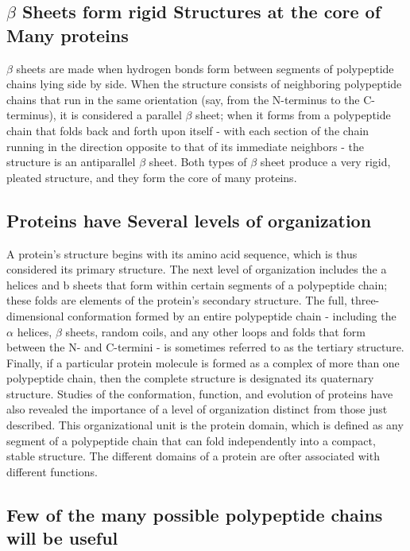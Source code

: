 \subsection{$\beta$ Sheets form rigid Structures at the core of Many proteins}

$\beta$ sheets are made when hydrogen bonds form between segments of polypeptide
chains lying side by side. When the structure consists of neighboring polypeptide chains that
run in the same orientation (say, from the N-terminus to the C-terminus),
it is considered a parallel $\beta$ sheet; when it forms from a polypeptide chain
that folds back and forth upon itself - with each section of the chain running
in the direction opposite to that of its immediate neighbors - the
structure is an antiparallel $\beta$ sheet. Both types of $\beta$ sheet
produce a very rigid, pleated structure, and they form the core of many
proteins.

\subsection{Proteins have Several levels of organization}

A protein’s structure begins with its
amino acid sequence, which is thus considered its primary structure. The
next level of organization includes the a helices and b sheets that form
within certain segments of a polypeptide chain; these folds are elements
of the protein’s secondary structure. The full, three-dimensional conformation
formed by an entire polypeptide chain - including the $\alpha$ helices,
$\beta$ sheets, random coils, and any other loops and folds that form between
the N- and C-termini - is sometimes referred to as the tertiary structure.
Finally, if a particular protein molecule is formed as a complex of more than one polypeptide
chain, then the complete structure is designated its quaternary structure.
Studies of the conformation, function, and evolution of proteins have
also revealed the importance of a level of organization distinct from
those just described. This organizational unit is the protein domain,
which is defined as any segment of a polypeptide chain that can fold
independently into a compact, stable structure.
The different domains of a protein are ofter associated with different functions.

\subsection{Few of the many possible polypeptide chains will be useful}

